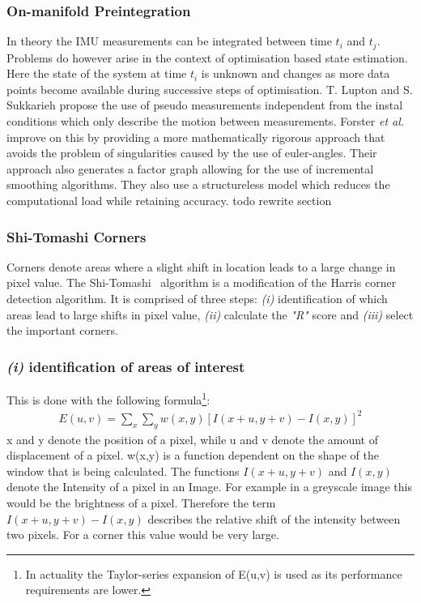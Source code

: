 \documentclass[11pt,a4paper]{article}
\begin{document}
\subsubsection{On-manifold Preintegration} \label{pre:on-manifold}
In theory the IMU measurements can be integrated between time $t_i$ and $t_j$.
Problems do however arise in the context of optimisation based state estimation. 
Here the state of the system at time $t_i$ is unknown and changes as more data points become available during successive steps of optimisation.
T. Lupton and S. Sukkarieh \cite{preint_lupton} propose the use of pseudo measurements independent from the instal conditions which only describe the motion between measurements.
Forster \textit{et al.} \cite{Forster_2017} improve on this by providing a more mathematically rigorous approach that avoids the problem of singularities caused by the use of euler-angles. 
Their approach also generates a factor graph allowing for the use of incremental smoothing algorithms. 
They also use a structureless model which reduces the computational load while retaining accuracy.
todo rewrite section

\subsubsection{Shi-Tomashi Corners} \label{Sec:Shi-Tomashi}
Corners denote areas where a slight shift in location leads to a large change in pixel value. 
The Shi-Tomashi~\cite{Shi_tomasi} algorithm is a modification of the Harris corner detection algorithm. 
It is comprised of three steps: \emph{(i)} identification of which areas lead to large shifts in pixel value, \emph{(ii)} calculate the \textit{"R"} score and \emph{(iii)} select the important corners.
\subsubsection*{\emph{(i)} identification of areas of interest} 

This is done with the following formula\footnote{In actuality the Taylor-series expansion of E(u,v) is used as its performance requirements are lower.}:
\begin{align}
    E(u,v) = \sum_{x} \sum_y w(x,y) [I(x+u,y+v)- I(x,y)]^2  
\end{align}
x and y denote the position of a pixel, while u and v denote the amount of displacement of a pixel.
w(x,y) is a function dependent on the shape of the window that is being calculated. 
The functions $I(x+u,y+v)$ and $I(x,y)$ denote the Intensity of a pixel in an Image.
For example in a greyscale image this would be the brightness of a pixel.
Therefore the term $I(x+u,y+v)- I(x,y)$ describes the relative shift of the intensity between two pixels. For a corner this value would be very large.
\end{document}
